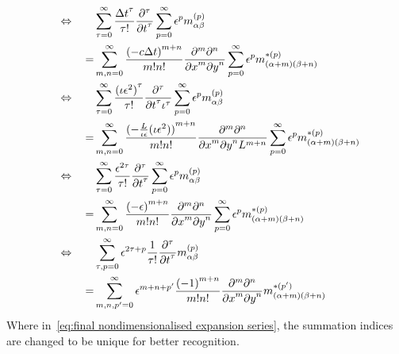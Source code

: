 \documentclass{article}
\begin{document}
\begin{align}
  \phantom{\equivalent\qquad}
  &\begin{aligned}
  \nonumber
    \mathllap{\equivalent\qquad} & \sum_{\tau = 0}^\infty \frac{{\Delta t}^\tau }{\tau!}  \frac{\partial^\tau}{{\partial t}^\tau} \sum_{p=0}^{\infty} \epsilon^p m_{\alpha\beta}^{(p)} \\
    = &{}\sum_{m,n = 0}^\infty \frac{{(-c\Delta t)}^{m+n}} {m!n!} \frac{\partial^m \partial^n}{ {\partial x}^m{\partial y}^n} \sum_{p=0}^{\infty} \epsilon^p m_{(\alpha + m)(\beta + n)}^{*(p)}
  \end{aligned}\\
  &\begin{aligned}
    \label{eq:nondimensionalised expansion series}
    \mathllap{\equivalent\qquad} &
    \sum_{\tau = 0}^\infty \frac{{(\iota\epsilon^2)}^\tau }{\tau!} \frac{\partial^\tau}{{\partial t}^\tau \iota^\tau} \sum_{p=0}^{\infty} \epsilon^p m_{\alpha\beta}^{(p)} \\
    = &{}\sum_{m,n = 0}^\infty \frac{{(-\frac{L}{\iota\epsilon}(\iota\epsilon^2))}^{m+n}} {m!n!}
    \frac{\partial^m \partial^n}{ {\partial x}^m{\partial y}^n L^{m+n}} \sum_{p=0}^{\infty} \epsilon^p m_{(\alpha + m)(\beta + n)}^{*(p)}
  \end{aligned} \\
  &\begin{aligned}
  \nonumber
    \mathllap{\equivalent\qquad} &
    \sum_{\tau = 0}^\infty \frac{\epsilon^{2\tau} }{\tau!} \frac{\partial^\tau}{{\partial t}^\tau} \sum_{p=0}^{\infty} \epsilon^p m_{\alpha\beta}^{(p)} \\
    = &{}\sum_{m,n = 0}^\infty \frac{{(-\epsilon)}^{m+n}} {m!n!}
    \frac{\partial^m \partial^n}{ {\partial x}^m{\partial y}^n } \sum_{p=0}^{\infty} \epsilon^p m_{(\alpha + m)(\beta + n)}^{*(p)}
  \end{aligned} \\
  &\begin{aligned}
    \label{eq:final nondimensionalised expansion series}
    \mathllap{\equivalent\qquad} &
    \sum_{\tau, p = 0}^\infty\epsilon^{2\tau + p} \frac{1} {\tau!} \frac{\partial^\tau}{{\partial t}^\tau} m_{\alpha\beta}^{(p)} \\
    = &{} \sum_{m,n,p' = 0}^\infty  \epsilon^{m+n+p'} \frac{{(-1)}^{m+n}} {m!n!}
    \frac{\partial^m \partial^n}{ {\partial x}^m{\partial y}^n } m_{(\alpha + m)(\beta + n)}^{*(p')}
  \end{aligned}
\end{align}
Where in~\eqref{eq:final nondimensionalised expansion series}, the summation indices are changed to be unique for better recognition.
\end{document}
